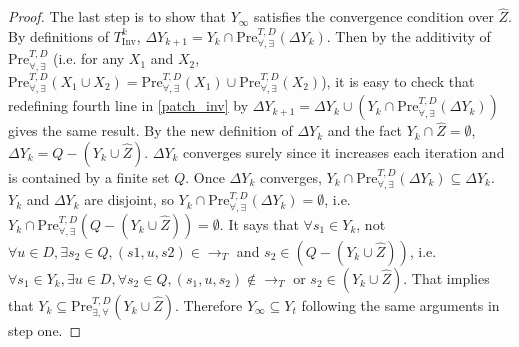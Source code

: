 \begin{proof}
	The last step is to show that $ Y_{\infty} $ satisfies the convergence condition over $ \widehat{Z} $. By definitions of $ T_{\text{Inv}}^k $, $ \Delta Y_{k+1}= Y_k \cap \text{Pre}_{\forall,\exists}^{T, D}(\Delta Y_k)$. Then by the additivity of $ \text{Pre}^{T,D}_{\forall,\exists} $ (i.e. for any $ X_1 $ and $ X_2 $, $ \text{Pre}_{\forall,\exists}^{T,D} (X_1\cup X_2)=\text{Pre}_{\forall,\exists}^{T,D} (X_1)\cup \text{Pre}_{\forall,\exists}^{T,D} (X_2) $), it is easy to check that redefining fourth line in \eqref{patch_inv} by $ \Delta Y_{k+1} = \Delta Y_k \cup (Y_k \cap \text{Pre}_{\forall,\exists}^{T, D}(\Delta Y_k)) $ gives the same result.  By the new definition of $ \Delta Y_k $ and the fact $ Y_k \cap \widehat{Z} = \emptyset $, $ \Delta Y_k = Q-(Y_k\cup \widehat{Z}) $. $ \Delta Y_k $ converges surely since it increases each iteration and is contained by a finite set $ Q $. Once $ \Delta Y_k $ converges, $ Y_k \cap \text{Pre}_{\forall,\exists}^{T, D}(\Delta Y_k)\subseteq \Delta Y_k $. $ Y_k $ and $ \Delta Y_k $ are disjoint, so $ Y_k \cap \text{Pre}_{\forall,\exists}^{T, D}(\Delta Y_k) = \emptyset $, i.e.  $ Y_k \cap \text{Pre}_{\forall,\exists}^{T, D}(Q-(Y_k\cup \widehat{Z})) = \emptyset $. It says that $ \forall s_1 \in Y_k$, not $\forall u\in D, \exists s_2\in Q, (s1,u,s2)\in \rightarrow_{T} $ and $s_2\in (Q-(Y_k\cup \widehat{Z}))$, i.e. $ \forall s_1 \in Y_k, \exists u\in D, \forall s_2 \in Q,  (s_1,u,s_2)\not\in \rightarrow_{T}$ or $ s_2\in (Y_k\cup \widehat{Z})$. That implies that $ Y_k\subseteq \text{Pre}_{\exists,\forall}^{T,D}(Y_k\cup \widehat{Z}) $. Therefore $ Y_{\infty}\subseteq Y_t $ following the same arguments in step one.
\end{proof}
\fi